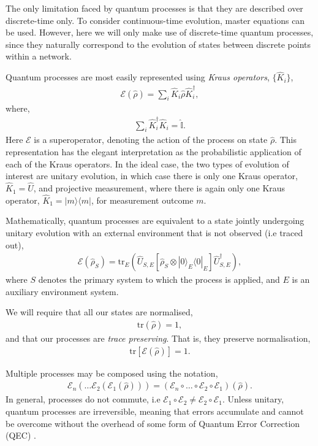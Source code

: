 \documentclass[aps,rmp,twocolumn,amsmath,amssymb,nofootinbib,superscriptaddress]{revtex4}
\newcommand{\bra}[1]{\langle#1|}
\newcommand{\ket}[1]{|#1\rangle}
\begin{document}
The only limitation faced by quantum processes is that they are described over discrete-time only. To consider continuous-time evolution, master equations can be used. However, here we will only make use of discrete-time quantum processes, since they naturally correspond to the evolution of states between discrete points within a network.

Quantum processes are most easily represented using \emph{Kraus operators}, $\{\hat{K}_i\}$,
\begin{align}
\mathcal{E}(\hat\rho) = \sum_i \hat{K}_i \hat\rho \hat{K}_i^\dag,
\end{align}
where,
\begin{align}
\sum_i \hat{K}_i^\dag \hat{K}_i = \hat{\mathbb{I}}.
\end{align}
Here $\mathcal{E}$ is a superoperator, denoting the action of the process on state $\hat\rho$. This representation has the elegant interpretation as the probabilistic application of each of the Kraus operators. In the ideal case, the two types of evolution of interest are unitary evolution, in which case there is only one Kraus operator, \mbox{$\hat{K}_1=\hat{U}$}, and projective measurement, where there is again only one Kraus operator, \mbox{$\hat{K}_1=\ket{m}\bra{m}$}, for measurement outcome $m$.

Mathematically, quantum processes are equivalent to a state jointly undergoing unitary evolution with an external environment that is not observed (i.e traced out),
\begin{align} \label{eq:proc_environment}
\mathcal{E}(\hat\rho_S) = \mathrm{tr}_E (\hat{U}_{S,E} [\hat\rho_S\otimes \ket{0}_E\bra{0}_E] \hat{U}^\dag_{S,E}),
\end{align}
where $S$ denotes the primary system to which the process is applied, and $E$ is an auxiliary environment system.

We will require that all our states are normalised,
\begin{align}
\mathrm{tr}(\hat\rho) = 1,
\end{align}
and that our processes are \emph{trace preserving}. That is, they preserve normalisation,
\begin{align}
\mathrm{tr}[\mathcal{E}(\hat\rho)] = 1.
\end{align}

Multiple processes may be composed using the notation,
\begin{align}
\mathcal{E}_n(\dots \mathcal{E}_2(\mathcal{E}_1(\hat\rho)))=(\mathcal{E}_n \circ \dots \circ \mathcal{E}_2\circ\mathcal{E}_1)(\hat\rho).
\end{align}
In general, processes do not commute, i.e \mbox{$\mathcal{E}_1\circ \mathcal{E}_2 \neq \mathcal{E}_2\circ \mathcal{E}_1$}. Unless unitary, quantum processes are irreversible, meaning that errors accumulate and cannot be overcome without the overhead of some form of Quantum Error Correction (QEC) \cite{???, bib:NielsenChuang00}.
\end{document}
